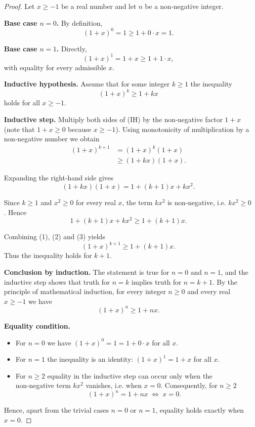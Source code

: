 \begin{proof}
Let \(x\ge -1\) be a real number and let \(n\) be a non‑negative integer.

\textbf{Base case \(n=0\).} By definition,
\[
(1+x)^{0}=1\ge 1+0\cdot x = 1 .
\]

\textbf{Base case \(n=1\).} Directly,
\[
(1+x)^{1}=1+x\ge 1+1\cdot x ,
\]
with equality for every admissible \(x\).

\textbf{Inductive hypothesis.} Assume that for some integer \(k\ge 1\) the inequality
\[
(1+x)^{k}\ge 1+kx \tag{IH}
\]
holds for all \(x\ge -1\).

\textbf{Inductive step.} Multiply both sides of (IH) by the non‑negative factor \(1+x\) (note that \(1+x\ge 0\) because \(x\ge -1\)). Using monotonicity of multiplication by a non‑negative number we obtain
\begin{align*}
(1+x)^{k+1}&=(1+x)^{k}(1+x)\\
&\ge (1+kx)(1+x). \tag{1}
\end{align*}

Expanding the right‑hand side gives
\[
(1+kx)(1+x)=1+(k+1)x+kx^{2}. \tag{2}
\]

Since \(k\ge 1\) and \(x^{2}\ge 0\) for every real \(x\), the term \(kx^{2}\) is non‑negative, i.e. \(kx^{2}\ge 0\). Hence
\[
1+(k+1)x+kx^{2}\ge 1+(k+1)x . \tag{3}
\]

Combining (1), (2) and (3) yields
\[
(1+x)^{k+1}\ge 1+(k+1)x .
\]
Thus the inequality holds for \(k+1\).

\textbf{Conclusion by induction.} The statement is true for \(n=0\) and \(n=1\), and the inductive step shows that truth for \(n=k\) implies truth for \(n=k+1\). By the principle of mathematical induction, for every integer \(n\ge 0\) and every real \(x\ge -1\) we have
\[
(1+x)^{n}\ge 1+nx .
\]

\textbf{Equality condition.}
\begin{itemize}
\item For \(n=0\) we have \((1+x)^{0}=1=1+0\cdot x\) for all \(x\).
\item For \(n=1\) the inequality is an identity: \((1+x)^{1}=1+x\) for all \(x\).
\item For \(n\ge 2\) equality in the inductive step can occur only when the non‑negative term \(kx^{2}\) vanishes, i.e. when \(x=0\). Consequently, for \(n\ge 2\)
\[
(1+x)^{n}=1+nx \;\Longleftrightarrow\; x=0 .
\]
\end{itemize}
Hence, apart from the trivial cases \(n=0\) or \(n=1\), equality holds exactly when \(x=0\).
\end{proof}
